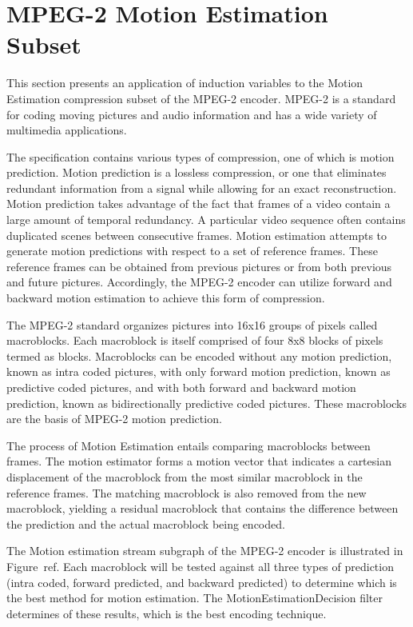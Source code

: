 \section{MPEG-2 Motion Estimation Subset}

This section presents an application of induction variables to the Motion Estimation compression subset of the MPEG-2 encoder.  MPEG-2 is a standard for coding moving pictures and audio information and has a wide variety of multimedia applications.  

The specification contains various types of compression, one of which is motion prediction.  Motion prediction is a lossless compression, or one that eliminates redundant information from a signal while allowing for an exact reconstruction.  Motion prediction takes advantage of the fact that frames of a video contain a large amount of temporal redundancy.  A particular video sequence often contains duplicated scenes between consecutive frames.  Motion estimation attempts to generate motion predictions with respect to a set of reference frames.  These reference frames can be obtained from previous pictures or from both previous and future pictures.  Accordingly, the MPEG-2 encoder can utilize forward and backward motion estimation to achieve this form of compression.

The MPEG-2 standard organizes pictures into 16x16 groups of pixels called macroblocks.  Each macroblock is itself comprised of four 8x8 blocks of pixels termed as blocks.  Macroblocks can be encoded without any motion prediction, known as intra coded pictures, with only forward motion prediction, known as predictive coded pictures, and with both forward and backward motion prediction, known as bidirectionally predictive coded pictures.  These macroblocks are the basis of MPEG-2 motion prediction.  

The process of Motion Estimation entails comparing macroblocks between frames.  The motion estimator forms a motion vector that indicates a cartesian displacement of the macroblock from the most similar macroblock in the reference frames.  The matching macroblock is also removed from the new macroblock, yielding a residual macroblock that contains the difference between the prediction and the actual macroblock being encoded.  

The Motion estimation stream subgraph of the MPEG-2 encoder is illustrated in Figure~ref{}.  Each macroblock will be tested against all three types of prediction (intra coded, forward predicted, and backward predicted) to determine which is the best method for motion estimation.  The MotionEstimationDecision filter determines of these results, which is the best encoding technique.

